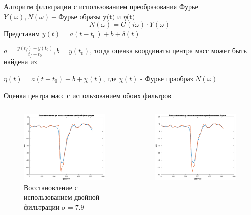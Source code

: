 \documentclass[10pt]{beamer}
\begin{document}
\begin{frame}{Алгоритм фильтрации с использованием преобразования Фурье}
	$Y(\omega),N(\omega) - \text{Фурье образы y(t) и $\eta$(t)}$
	\[
		N(\omega)=G(i\omega)\cdot Y(\omega)
	\]
	Представим $y(t)=a(t-t_0)+b+\delta(t)$

	$a=\frac{y(t_f)-y(t_0)}{t_f-t_0}, b=y(t_0)$, тогда оценка координаты центра масс может быть найдена из

	$\eta(t)=a(t-t_0)+b+\chi(t)$, где $\chi(t)$ - Фурье праобраз $N(\omega)$

\end{frame}


\begin{frame}{Оценка центра масс с использованием обоих фильтров}
	\begin{columns}
		\begin{figure}[h!]
			\centering
			\includegraphics[width=1\linewidth]{restore_eta_double_real.eps}
			\caption{Восстановление с использованием двойной фильтрации $\sigma=7.9$}
			\label{restore_double_real}
		\end{figure}
		\begin{figure}[h!]
			\centering
			\includegraphics[width=1\linewidth]{restore_eta_fur_real.eps}

\end{figure}
\end{columns}
\end{frame}
\end{document}
